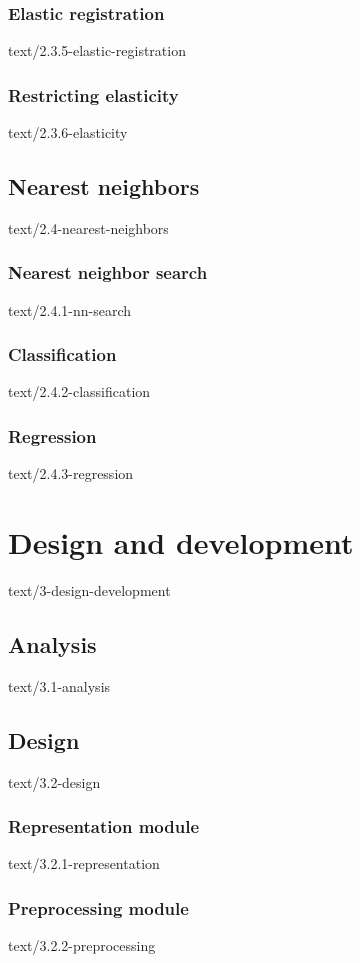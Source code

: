 \documentclass[epsbased,copyleft,final,loe, lof,extendedindex,firstnumbered,tfg,covers,english]{tfgtfmthesisuam}
\begin{document}
  \subsection{Elastic registration\label{SEC:ELASTICREG}}{text/2.3.5-elastic-registration}
  \subsection{Restricting elasticity\label{SEC:RESTRICT}}{text/2.3.6-elasticity}

\section{Nearest neighbors\label{SEC:NEIGHBORS}}{text/2.4-nearest-neighbors}
  \subsection{Nearest neighbor search\label{SEC:SEARCH}}{text/2.4.1-nn-search}
  \subsection{Classification\label{SEC:SEARCH}}{text/2.4.2-classification}
  \subsection{Regression\label{SEC:SEARCH}}{text/2.4.3-regression}


\chapter{Design and development\label{CAP:DESIGNDEV}}{text/3-design-development}

\section{Analysis\label{SEC:ANALYSIS}}{text/3.1-analysis}
\section{Design\label{SEC:DESIGN}}{text/3.2-design}
  \subsection{Representation module\label{SEC:REPRMOD}}{text/3.2.1-representation}
  \subsection{Preprocessing module\label{SEC:PREPMOD}}{text/3.2.2-preprocessing}
\end{document}
